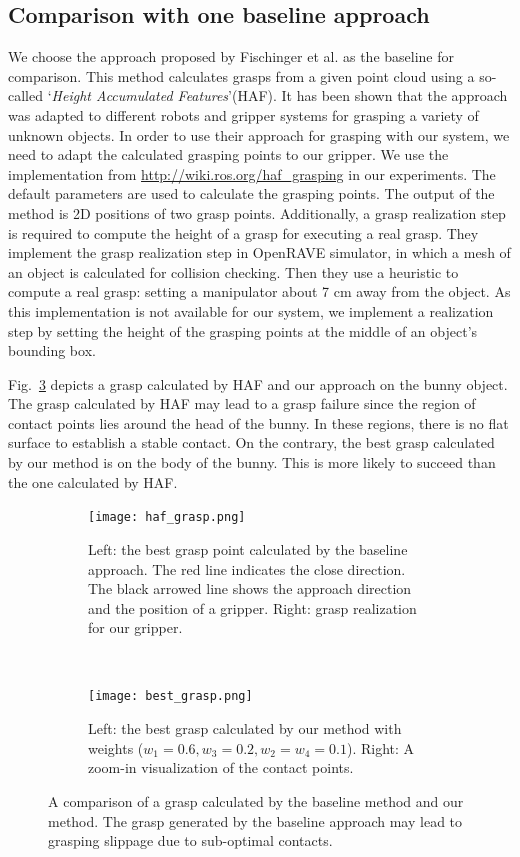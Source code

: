 \subsection{Comparison with one baseline approach}
We choose the approach proposed by Fischinger et al. \cite{FischingerWV15} as the baseline  for comparison. This method calculates grasps from a given point cloud using a so-called `\textit{Height Accumulated Features}'(HAF). It has been shown that the approach was adapted to different robots and gripper systems for grasping a variety of unknown objects. In order to use their approach for grasping with our system, we need to adapt the calculated grasping points to our gripper. We use the implementation from \url{http://wiki.ros.org/haf_grasping} in our experiments. The default parameters are used to calculate the grasping points. The output of the method is 2D positions of two grasp points. Additionally, a grasp realization step is required to compute the height of a grasp for executing a real grasp. They implement the grasp realization step in OpenRAVE simulator, in which a  mesh of an object is calculated for collision checking. Then they use a heuristic to compute a real grasp: setting a manipulator about 7 cm away from the object. As this implementation is not available for our system, we implement a realization step by setting the height of the grasping points at the middle of an object's bounding box.  

Fig.~\ref{fig:baseline_comparison} depicts a grasp calculated by HAF and our approach on the bunny object. The grasp calculated by HAF may lead to a grasp failure since the region of contact points lies around the head of the bunny. In these regions, there is no flat surface to establish a stable contact. On the contrary, the best grasp calculated by our method is on the body of the bunny. This is more likely to succeed than the one calculated by HAF.  
\begin{figure}[!htb]
    \centering
    \begin{subfigure}[t]{0.45\textwidth}
        \texttt{[image: haf\_grasp.png]}
        \caption{Left: the best grasp point calculated by the baseline approach. The red line indicates the close direction. The black arrowed line shows the approach direction and the position of a gripper. Right: grasp realization for our gripper.}
        \label{fig:haf_grasp}
    \end{subfigure}
    ~ %
    \begin{subfigure}[t]{0.45\textwidth}
        \texttt{[image: best\_grasp.png]}
        \caption{Left: the best grasp calculated by our method with weights ($w_1 = 0.6, w_3=0.2, w_2=w_4=0.1$). Right: A zoom-in visualization of the contact points.  }
        \label{fig:best_grasp}
    \end{subfigure}
    \caption{A comparison of a grasp calculated by the baseline method and our method. The grasp generated by the baseline approach may lead to grasping slippage due to sub-optimal contacts. }\label{fig:baseline_comparison}
\end{figure}

